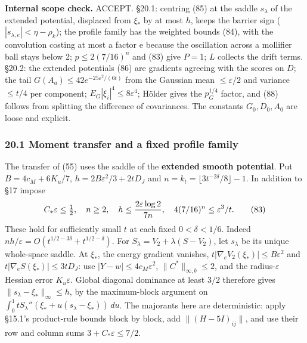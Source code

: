 \documentclass[11pt,a4paper]{article}
\begin{document}
\textbf{Internal scope check.} ACCEPT. §20.1: centring (85) at the
saddle \(s_\lambda\) of the extended potential, displaced from \(\xi_*\)
by at most \(h\), keeps the barrier sign
(\(|s_{\lambda,e}|<\eta-\rho_k\)); the profile family has the weighted
bounds (84), with the convolution costing at most a factor \(\mathrm e\)
because the oscillation across a mollifier ball stays below 2;
\(p\le2(7/16)^n\) and (83) give \(P=1\); \(L\) collects the drift terms.
§20.2: the extended potentials (86) are gradients agreeing with the
scores on \(D\); the tail \(G(A_a)\le42e^{-25\varepsilon^2/(6t)}\) from
the Gaussian mean \(\le\varepsilon/2\) and variance \(\le t/4\) per
component; \(E_G|\xi_i|^4\le8\varepsilon^4\); Hölder gives the
\(p_G^{1/4}\) factor, and (88) follows from splitting the difference of
covariances. The constants \(G_0,D_0,A_0\) are loose and explicit.

\hypertarget{moment-transfer-and-a-fixed-profile-family}{%
\subsubsection{20.1 Moment transfer and a fixed profile
family}\label{moment-transfer-and-a-fixed-profile-family}}

The transfer of (55) uses the saddle of the \textbf{extended smooth
potential}. Put \(B=4c_M+6K_u/7\), \(h=2B\varepsilon^2/3+2tD_J\) and
\(n=k_t=\lfloor3t^{-2\delta}/8\rfloor-1\). In addition to §17 impose
\[C_*\varepsilon\le\tfrac12,\quad n\ge2,\quad
h\le {2\varepsilon\log2\over7n},\quad
4(7/16)^n\le\varepsilon^3/t.\tag{83}\] These hold for sufficiently small
\(t\) at each fixed \(0<\delta<1/6\). Indeed
\(nh/\varepsilon=O(t^{1/2-3\delta}+t^{1/2-\delta})\). For
\(S_\lambda=V_2+\lambda(S-V_2)\), let \(s_\lambda\) be its unique
whole-space saddle. At \(\xi_*\), the energy gradient vanishes,
\(t|\nabla_eV_2(\xi_*)|\le B\varepsilon^2\) and
\(t|\nabla_eS(\xi_*)|\le3tD_J\): use \(|Y-w|\le4c_M\varepsilon^2\),
\(\|C^*\|_{\infty,b}\le2\), and the radius-\(\varepsilon\) Hessian error
\(K_u\varepsilon\). Global diagonal dominance at least \(3/2\) therefore
gives \(\|s_\lambda-\xi_*\|_\infty\le h\), by the maximum-block argument
on \(\int_0^1tS_\lambda''(\xi_*+u(s_\lambda-\xi_*))\,du\). The majorants
here are deterministic: apply §15.1's product-rule bounds block by
block, add \(\|(H-5I)_{ij}\|\), and use their row and column sums
\(3+C_*\varepsilon\le7/2\).
\end{document}
